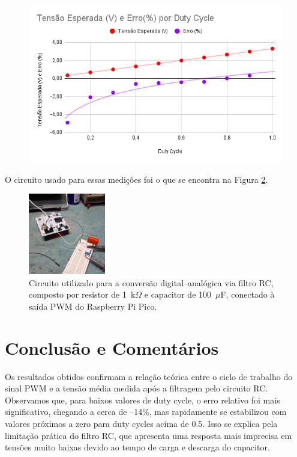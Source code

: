 \documentclass{article}
\begin{document}
\begin{figure}[H] 
    \centering
    \includegraphics[width=14cm]{fig/grafico.png}
    \label{fig:grafico}
\end{figure}

O circuito usado para essas medições foi o que se encontra na Figura \ref{fig:circuito}.

\begin{figure}[H] 
    \centering
    \includegraphics[width=0.3\textwidth]{fig/circuito.jpeg}
    \caption{Circuito utilizado para a conversão digital–analógica via filtro RC, composto por resistor de 1~k$\Omega$ e capacitor de 100~$\mu$F, conectado à saída PWM do Raspberry Pi Pico.}
    \label{fig:circuito}
\end{figure}


\section{Conclusão e Comentários}

Os resultados obtidos confirmam a relação teórica entre o ciclo de trabalho do sinal PWM e a tensão média medida após a filtragem pelo circuito RC. 
Observamos que, para baixos valores de duty cycle, o erro relativo foi mais significativo, chegando a cerca de --14\%, mas rapidamente se estabilizou com valores próximos a zero para duty cycles acima de 0.5. 
Isso se explica pela limitação prática do filtro RC, que apresenta uma resposta mais imprecisa em tensões muito baixas devido ao tempo de carga e descarga do capacitor.
\end{document}
